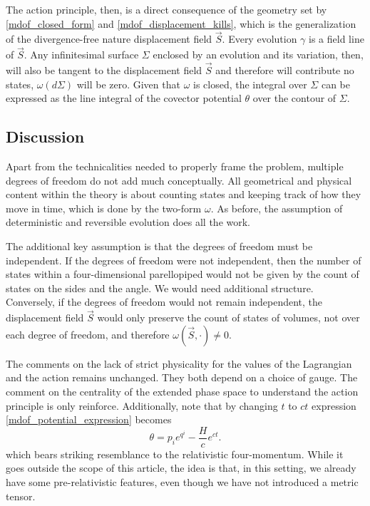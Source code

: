 \documentclass[10pt,twocolumn, nofootinbib]{revtex4-2}
\begin{document}
The action principle, then, is a direct consequence of the geometry set by \ref{mdof_closed_form} and \ref{mdof_displacement_kills}, which is the generalization of the divergence-free nature displacement field $\vec{S}$. Every evolution $\gamma$ is a field line of $\vec{S}$. Any infinitesimal surface $\Sigma$ enclosed by an evolution and its variation, then, will also be tangent to the displacement field $\vec{S}$ and therefore will contribute no states, $\omega(d\Sigma)$ will be zero. Given that $\omega$ is closed, the integral over $\Sigma$ can be expressed as the line integral of the covector potential $\theta$ over the contour of $\Sigma$.

\subsection{Discussion}

Apart from the technicalities needed to properly frame the problem, multiple degrees of freedom do not add much conceptually. All geometrical and physical content within the theory is about counting states and keeping track of how they move in time, which is done by the two-form $\omega$. As before, the assumption of deterministic and reversible evolution does all the work.

The additional key assumption is that the degrees of freedom must be independent. If the degrees of freedom were not independent, then the number of states within a four-dimensional parellopiped would not be given by the count of states on the sides and the angle. We would need additional structure. Conversely, if the degrees of freedom would not remain independent, the displacement field $\vec{S}$ would only preserve the count of states of volumes, not over each degree of freedom, and therefore $\omega(\vec{S}, \cdot) \neq 0$.

The comments on the lack of strict physicality for the values of the Lagrangian and the action remains unchanged. They both depend on a choice of gauge. The comment on the centrality of the extended phase space to understand the action principle is only reinforce. Additionally, note that by changing $t$ to $ct$ expression \ref{mdof_potential_expression} becomes
\begin{equation}\label{mdof_potential_relativistic}
	\theta = p_i e^{q^i} - \frac{H}{c} e^{ct}.
\end{equation}
which bears striking resemblance to the relativistic four-momentum. While it goes outside the scope of this article, the idea is that, in this setting, we already have some pre-relativistic features, even though we have not introduced a metric tensor.
\end{document}

